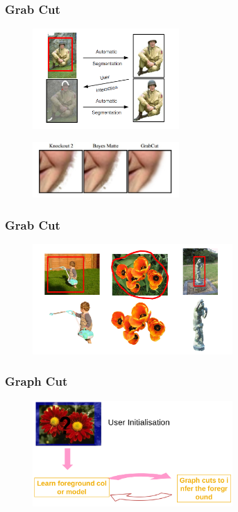 \documentclass[notheorems,mathserif,table,compress]{beamer}  %
\begin{document}
\begin{frame}
\frametitle{Grab Cut}
  \begin{figure}[!ht]
  \centering
   \includegraphics[width=2.2in]{Grab.png}
   \end{figure}
  \begin{figure}[!ht]
  \centering
   \includegraphics[width=2.2in]{matting.png}
   \end{figure}
\end{frame}

\begin{frame}
\frametitle{Grab Cut}
  \begin{figure}[!ht]
  \centering
   \includegraphics[width=3.0in]{Grab2.png}
   \end{figure}
\end{frame}

\begin{frame}
\frametitle{Graph Cut}
  \begin{figure}[!ht]
  \centering
   \includegraphics[width=3.0in]{Grab3.png}
   \end{figure}
\end{frame}
\end{document}
